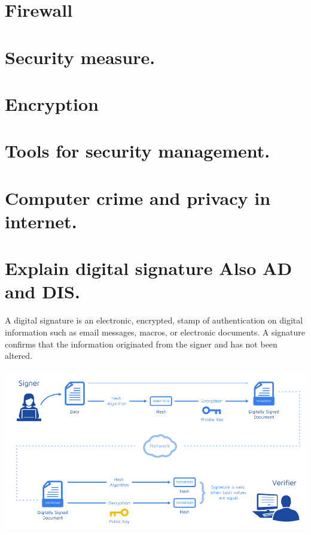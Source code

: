 \documentclass[a4paper]{article}
\begin{document}
\section{Firewall}
\section{Security measure.}
\section{Encryption}
\section{Tools for security management.}
\section{Computer crime and privacy in internet. }
\section{Explain digital signature Also AD and DIS.}
A digital signature is an electronic, encrypted, stamp of authentication on digital information such as email messages, macros, or electronic documents. A signature confirms that the information originated from the signer and has not been altered.

\includegraphics[scale=0.5]{key}
\end{document}
